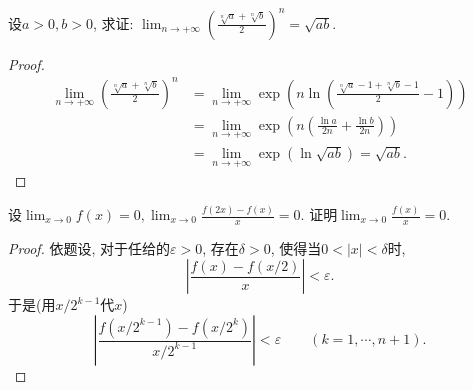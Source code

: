 \begin{quiza}
\begin{solution}
\end{solution}
\woe 设\(a>0,b>0\), 求证: \(\lim_{n\rightarrow+\infty}\left(\frac{\sqrt[n]{a}+\sqrt[n]{b}}{2}\right)^n=\sqrt{ab}\).
\begin{proof}
\[\begin{split}
\lim_{n\rightarrow+\infty}\left(\frac{\sqrt[n]{a}+\sqrt[n]{b}}{2}\right)^n&=\lim_{n\rightarrow+\infty}\exp\left(n\ln\left(\frac{\sqrt[n]{a}-1+\sqrt[n]{b}-1}{2}-1\right)\right)\\&=\lim_{n\rightarrow+\infty}\exp\left(n\left(\frac{\ln a}{2n}+\frac{\ln b}{2n}\right)\right)\\&=\lim_{n\rightarrow+\infty}\exp\left(\ln\sqrt{ab}\right)=\sqrt{ab}.
\end{split}\]
\end{proof}
\woe 设\(\lim_{x\rightarrow 0}f(x)=0,\lim_{x\rightarrow 0}\frac{f(2x)-f(x)}{x}=0\). 证明\(\lim_{x\rightarrow 0}\frac{f(x)}{x}=0.\)
\begin{proof}
依题设, 对于任给的\(\varepsilon>0\), 存在\(\delta>0\), 使得当\(0<|x|<\delta\)时,\[\left|\frac{f(x)-f(x/2)}{x}\right|<\varepsilon.\]于是(用\(x/2^{k-1}\)代\(x\))\[\left|\frac{f\left(x/2^{k-1}\right)-f\left(x/2^k\right)}{x/2^{k-1}}\right|<\varepsilon\qquad (k=1,\cdots,n+1).\]


\end{proof}
\end{quiza}
